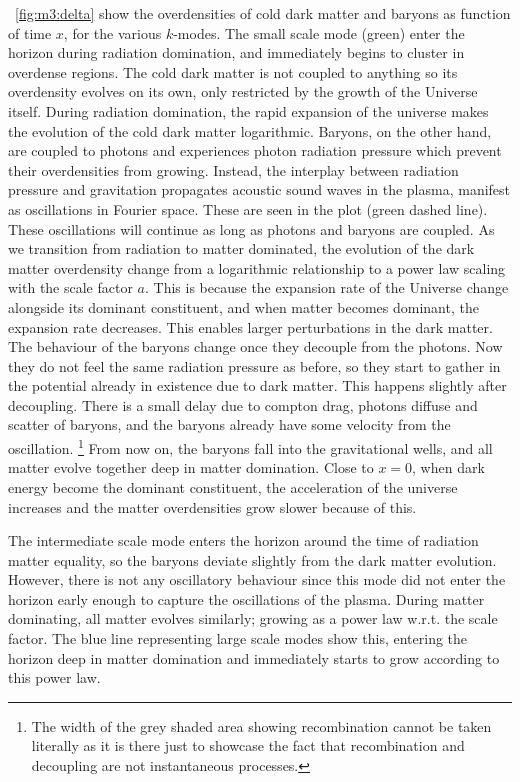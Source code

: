     ~\cref{fig:m3:delta} show the overdensities of cold dark matter and baryons as function of time $x$, for the various $k$-modes. The small scale mode (green) enter the horizon during radiation domination, and immediately begins to cluster in overdense regions. The cold dark matter is not coupled to anything so its overdensity evolves on its own, only restricted by the growth of the Universe itself. During radiation domination, the rapid expansion of the universe makes the evolution of the cold dark matter logarithmic. Baryons, on the other hand, are coupled to photons and experiences photon radiation pressure which prevent their overdensities from growing. Instead, the interplay between radiation pressure and gravitation propagates acoustic sound waves in the plasma, manifest as oscillations in Fourier space. These are seen in the plot (green dashed line). These oscillations will continue as long as photons and baryons are coupled. As we transition from radiation to matter dominated, the evolution of the dark matter overdensity change from a logarithmic relationship to a power law scaling with the scale factor $a$. This is because the expansion rate of the Universe change alongside its dominant constituent, and when matter becomes dominant, the expansion rate decreases. This enables larger perturbations in the dark matter. The behaviour of the baryons change once they decouple from the photons. Now they do not feel the same radiation pressure as before, so they start to gather in the potential already in existence due to dark matter. This happens slightly after decoupling. There is a small delay due to compton drag, photons diffuse and scatter of baryons, and the baryons already have some velocity from the oscillation. \footnote{The width of the grey shaded area showing recombination cannot be taken literally as it is there just to showcase the fact that recombination and decoupling are not instantaneous processes.} From now on, the baryons fall into the gravitational wells, and all matter evolve together deep in matter domination. Close to $x=0$, when dark energy become the dominant constituent, the acceleration of the universe increases and the matter overdensities grow slower because of this.

    The intermediate scale mode enters the horizon around the time of radiation matter equality, so the baryons deviate slightly from the dark matter evolution. However, there is not any oscillatory behaviour since this mode did not enter the horizon early enough to capture the oscillations of the plasma. During matter dominating, all matter evolves similarly; growing as a power law w.r.t. the scale factor. The blue line representing large scale modes show this, entering the horizon deep in matter domination and immediately starts to grow according to this power law. 
    


